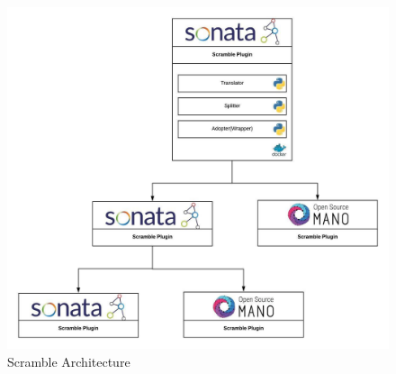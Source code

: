 \begin{figure} [h]
	\centering
	\includegraphics[width=1\linewidth]{figures/scramblearch}
	\caption{Scramble Architecture}
	\label{fig:scramblearch}
\end{figure}
